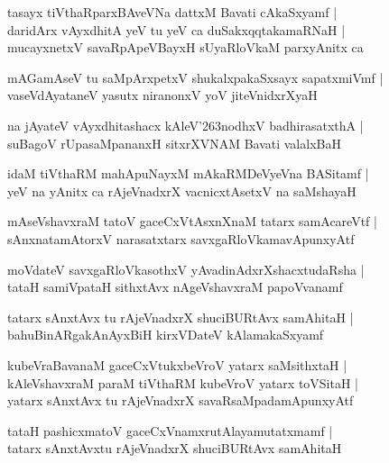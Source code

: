 \documentclass[twoside,12pt,openright]{book}
\def\S{\char'263}
\newcounter{shloka}[chapter]
\begin{document}
\begin{shloka}
tasayx tiVthaRparxBAveVNa dattxM Bavati cAkaSxyamf |\\
daridArx vAyxdhitA yeV tu yeV ca duSakxqqtakamaRNaH |\\
mucayxnetxV savaRpApeVBayxH sUyaRloVkaM parxyAnitx ca
\end{shloka}

\begin{shloka}
mAGamAseV tu saMpArxpetxV shukalxpakaSxsayx sapatxmiVmf |\\
vaseVdAyataneV yasutx niranonxV yoV jiteVnidxrXyaH
\end{shloka}

\begin{shloka}
na jAyateV vAyxdhitashacx kAleV\S nodhxV badhirasatxthA |\\
suBagoV rUpasaMpananxH sitxrXVNAM Bavati valalxBaH
\end{shloka}

\begin{shloka}
idaM tiVthaRM mahApuNayxM mAkaRMDeVyeVna BASitamf |\\
yeV na yAnitx ca rAjeVnadxrX vacnicxtAsetxV na saMshayaH 
\end{shloka}

\begin{shloka}
mAseVshavxraM tatoV gaceCxVtAsxnXnaM tatarx samAcareVtf |\\
sAnxnatamAtorxV narasatxtarx savxgaRloVkamavApunxyAtf 
\end{shloka}

\begin{shloka}
moVdateV savxgaRloVkasothxV yAvadinAdxrXshacxtudaRsha |\\
tataH samiVpataH sithxtAvx nAgeVshavxraM papoVvanamf 
\end{shloka}

\begin{shloka}
tatarx sAnxtAvx tu rAjeVnadxrX shuciBURtAvx samAhitaH |\\
bahuBinARgakAnAyxBiH kirxVDateV kAlamakaSxyamf 
\end{shloka}

\begin{shloka}
kubeVraBavanaM gaceCxVtukxbeVroV yatarx saMsithxtaH |\\
kAleVshavxraM paraM tiVthaRM kubeVroV yatarx toVSitaH |\\
yatarx sAnxtAvx tu rAjeVnadxrX savaRsaMpadamApunxyAtf 
\end{shloka}

\begin{shloka}
tataH pashicxmatoV gaceCxVnamxrutAlayamutatxmamf |\\
tatarx sAnxtAvxtu rAjeVnadxrX shuciBURtAvx samAhitaH 
\end{shloka}
\end{document}
